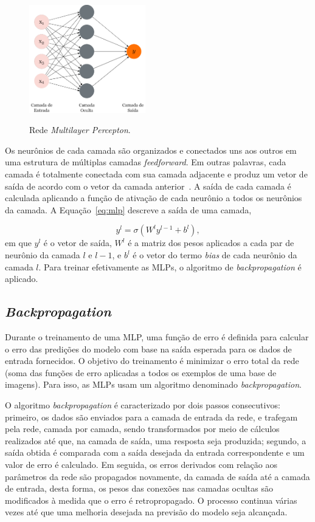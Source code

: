 \begin{figure}[!ht]
    \centering
    \caption{Rede \textit{Multilayer Percepton}.}
    \includegraphics[width=0.45\textwidth]{figuras/RNA.png}
    \label{fig:rna}
\end{figure}

Os neurônios de cada camada são organizados e conectados uns aos outros em uma estrutura de múltiplas camadas \textit{feedforward}. Em outras palavras, cada camada é totalmente conectada com sua camada adjacente e produz um vetor de saída de acordo com o vetor da camada anterior~\cite{BERSIMIS201931}. A saída de cada camada é calculada aplicando a função de ativação de cada neurônio a todos os neurônios da camada. A Equação~\ref{eq:mlp} descreve a saída de uma camada,

\begin{equation}
\label{eq:mlp}
y^l = \sigma(W^ly^{l-1} + b^l),
\end{equation}
em que $y^l$ é o vetor de saída, $W^l$ é a matriz dos pesos aplicados a cada par de neurônio da camada $l$ e $l-1$, e $b^l$ é o vetor do termo \textit{bias} de cada neurônio da camada $l$. Para treinar efetivamente as MLPs, o algoritmo de \textit{backpropagation} é aplicado.

\subsection{\textit{Backpropagation}}
\label{sec:backpropagation}

Durante o treinamento de uma MLP, uma função de erro é definida para calcular o erro das predições do modelo com base na saída esperada para os dados de entrada fornecidos. O objetivo do treinamento é minimizar o erro total da rede (soma das funções de erro aplicadas a todos os exemplos de uma base de imagens). Para isso, as MLPs usam um algoritmo denominado \textit{backpropagation}.

O algoritmo \textit{backpropagation} é caracterizado por dois passos consecutivos: primeiro, os dados são enviados para a camada de entrada da rede, e trafegam pela rede, camada por camada, sendo transformados por meio de cálculos realizados até que, na camada de saída, uma resposta seja produzida; segundo, a saída obtida é comparada com a saída desejada da entrada correspondente e um valor de erro é calculado. Em seguida, os erros derivados com relação aos parâmetros da rede são propagados novamente, da camada de saída até a camada de entrada, desta forma, os pesos das conexões nas camadas ocultas são modificados à medida que o erro é retropropagado. O processo continua várias vezes até que uma melhoria desejada na previsão do modelo seja alcançada.

